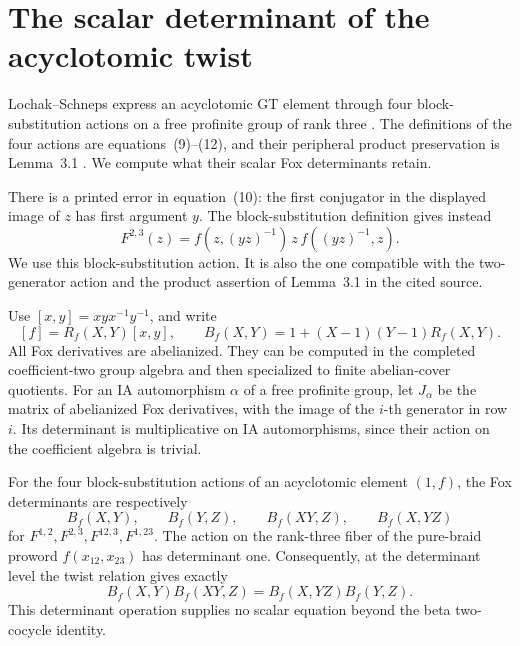 \section{The scalar determinant of the acyclotomic twist}
\label{sec:twist-scalar-determinant}

Lochak--Schneps express an acyclotomic GT element through four
block-substitution actions on a free profinite group of rank three
\cite[Theorem~2.1, equation~(8), pp.~121--122]{LS2015Twists}.
The definitions of the four actions are equations~(9)--(12),
and their peripheral product preservation is Lemma~3.1
\cite[pp.~122--124]{LS2015Twists}. We compute what their scalar
Fox determinants retain.

There is a printed error in equation~(10): the first conjugator in
the displayed image of \(z\) has first argument \(y\).
The block-substitution definition gives instead
\[
 F^{2,3}(z)=f(z,(yz)^{-1})\,z\,f((yz)^{-1},z).
\]
We use this block-substitution action. It is also the one compatible
with the two-generator action and the product assertion of
Lemma~3.1 in the cited source.

Use \([x,y]=xyx^{-1}y^{-1}\), and write
\[
 [f]=R_f(X,Y)[x,y],\qquad
 B_f(X,Y)=1+(X-1)(Y-1)R_f(X,Y).
\]
All Fox derivatives are abelianized. They can be computed in the
completed coefficient-two group algebra and then specialized to
finite abelian-cover quotients. For an IA automorphism \(\alpha\)
of a free profinite group, let \(J_\alpha\) be the matrix of
abelianized Fox derivatives, with the image of the \(i\)-th
generator in row \(i\). Its determinant is multiplicative on IA
automorphisms, since their action on the coefficient algebra is
trivial.

\begin{proposition}\label{prop:twist-determinant-beta}
For the four block-substitution actions of an acyclotomic element
\((1,f)\), the Fox determinants are respectively
\[
 B_f(X,Y),\qquad B_f(Y,Z),\qquad
 B_f(XY,Z),\qquad B_f(X,YZ)
\]
for \(F^{1,2},F^{2,3},F^{12,3},F^{1,23}\).
The action on the rank-three fiber of the pure-braid proword
\(f(x_{12},x_{23})\) has determinant one. Consequently, at
the determinant level the twist relation gives exactly
\begin{equation}
 B_f(X,Y)B_f(XY,Z)=B_f(X,YZ)B_f(Y,Z).
 \label{eq:twist-determinant-beta}
\end{equation}
This determinant operation supplies no scalar equation beyond the
beta two-cocycle identity.
\end{proposition}

